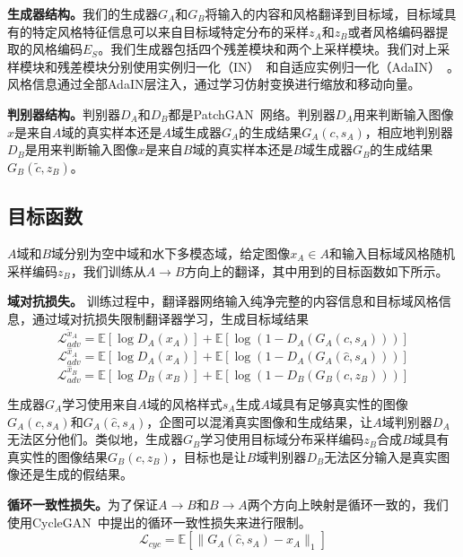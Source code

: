 \textbf{生成器结构。}我们的生成器$G_A$和$G_B$将输入的内容和风格翻译到目标域，目标域具有的特定风格特征信息可以来自目标域特定分布的采样$z_A$和$z_B$或者风格编码器提取的风格编码$E_S$。我们生成器包括四个残差模块和两个上采样模块。我们对上采样模块和残差模块分别使用实例归一化（IN）~\cite{ulyanov2016instance}和自适应实例归一化（AdaIN）~\cite{huang2017arbitrary}。风格信息通过全部AdaIN层注入，通过学习仿射变换进行缩放和移动向量。

\textbf{判别器结构。}判别器$D_A$和$D_B$都是PatchGAN~\cite{isola2017image}网络。判别器$D_A$用来判断输入图像$x$是来自$A$域的真实样本还是$A$域生成器$G_A$的生成结果$G_A(c,s_A)$，相应地判别器$D_B$是用来判断输入图像$x$是来自$B$域的真实样本还是$B$域生成器$G_B$的生成结果$G_B(\tilde{c},z_B)$。

\subsection{目标函数}
$A$域和$B$域分别为空中域和水下多模态域，给定图像$x_A \in A$和输入目标域风格随机采样编码$z_B$，我们训练从$A \rightarrow B$方向上的翻译，其中用到的目标函数如下所示。

\textbf{域对抗损失。} 训练过程中，翻译器网络输入纯净完整的内容信息和目标域风格信息，通过域对抗损失限制翻译器学习，生成目标域结果
\begin{equation}
\label{equ:adv_a_}
\mathcal{L}_{adv}^{\tilde{x}_A} = \mathbb{E}[\log D_A(x_A)] + \mathbb{E}[\log(1-D_A(G_A(c,s_A)))]
\end{equation}
\begin{equation}
\label{equ:adv_a}
\mathcal{L}_{adv}^{\hat{x}_A} = \mathbb{E}[\log D_A(x_A)] + \mathbb{E}[\log(1-D_A(G_A(\hat{c},s_A)))]
\end{equation}
\begin{equation}
\label{equ:adv_b}
\mathcal{L}_{adv}^{\hat{x}_B} = \mathbb{E}[\log D_B(x_B)] + \mathbb{E}[\log(1-D_B(G_B(c,z_B)))]
\end{equation}

生成器$G_A$学习使用来自$A$域的风格样式$s_A$生成$A$域具有足够真实性的图像$G_A(c,s_A)$和$G_A(\hat{c},s_A)$，企图可以混淆真实图像和生成结果，让$A$域判别器$D_A$无法区分他们。类似地，生成器$G_B$学习使用目标域分布采样编码$z_B$合成$B$域具有真实性的图像结果$G_B(c,z_B)$，目标也是让$B$域判别器$D_B$无法区分输入是真实图像还是生成的假结果。

\textbf{循环一致性损失。}为了保证$A \rightarrow B$和$B \rightarrow A$两个方向上映射是循环一致的，我们使用CycleGAN~\cite{zhu2017unpaired}中提出的循环一致性损失来进行限制。
\begin{equation}
\label{equ:cycle}
\mathcal{L}_{cyc} = \mathbb{E}[\| G_A(\hat{c}, s_A) - x_A \|_1]
\end{equation}

